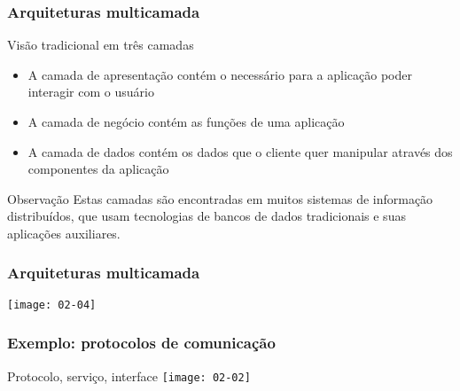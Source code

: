 \documentclass[Ligatures=TeX,table,brazil,svgnames,usetotalslideindicator,compress,10pt]{beamer}
\begin{document}
\begin{frame}
  \frametitle{Arquiteturas multicamada}
  \begin{block}{Visão tradicional em três camadas}
    \begin{itemize}
    \item A \alert{camada de apresentação} contém o necessário para a aplicação poder interagir com o usuário
    \item A \alert{camada de negócio} contém as funções de uma aplicação
    \item A \alert{camada de dados} contém os dados que o cliente quer manipular através dos componentes da aplicação
    \end{itemize}
  \end{block}

  \pause

  \begin{alertblock}{Observação}
    Estas camadas são encontradas em muitos sistemas de informação distribuídos, que usam tecnologias de bancos de dados tradicionais e suas aplicações auxiliares.
  \end{alertblock}

\end{frame}

\begin{frame}
  \frametitle{Arquiteturas multicamada}
  \begin{center}
    \texttt{[image: 02-04]}
  \end{center}
\end{frame}

\begin{frame}
  \frametitle{Exemplo: protocolos de comunicação}
  \begin{block}{Protocolo, serviço, interface}
    \texttt{[image: 02-02]}
  \end{block}
\end{frame}
\end{document}

